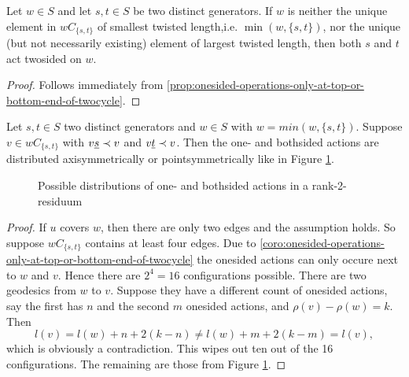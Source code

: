 \begin{coro}
	Let $w \in S$ and let $s,t \in S$ be two distinct generators. If $w$ is neither the unique element in $wC_{\{s,t\}}$ of smallest twisted length,i.e. $\min(w,\{s,t\})$, nor the unique (but not necessarily existing) element of largest twisted length, then both $s$ and $t$ act twosided on $w$.

	\begin{proof}
		Follows immediately from \ref{prop:onesided-operations-only-at-top-or-bottom-end-of-twocycle}.
	\end{proof}
\end{coro}

\begin{lemm}
	Let $s,t \in S$ two distinct generators and $w \in S$ with $w = min(w,\{s,t\})$. Suppose $v \in wC_{\{s,t\}}$ with $v \underline{s} \prec v$ and $v \underline{t} \prec v$. Then the one- and bothsided actions are distributed axisymmetrically or pointsymmetrically like in Figure \ref{fig:dist-one-bothsided-actions-in-rank-2-residuum}.

	\begin{figure}[ht]
		\centering
		
		
		
		
		
		
		\caption{Possible distributions of one- and bothsided actions in a rank-2-residuum}
		\label{fig:dist-one-bothsided-actions-in-rank-2-residuum}
	\end{figure}

	\begin{proof}
		If $u$ covers $w$, then there are only two edges and the assumption holds. So suppose $wC_{\{s,t\}}$ contains at least four edges. Due to \ref{coro:onesided-operations-only-at-top-or-bottom-end-of-twocycle} the onesided actions can only occure next to $w$ and $v$. Hence there are $2^4 = 16$ configurations possible. There are two geodesics from $w$ to $v$. Suppose they have a different count of onesided actions, say the first has $n$ and the second $m$ onesided actions, and $\rho(v) - \rho(w) = k$. Then
		$$ l(v) = l(w) + n + 2(k-n) \neq l(w) + m + 2(k-m) = l(v), $$
		which is obviously a contradiction. This wipes out ten out of the 16 configurations. The remaining are those from Figure \ref{fig:dist-one-bothsided-actions-in-rank-2-residuum}.
	\end{proof}
\end{lemm}


